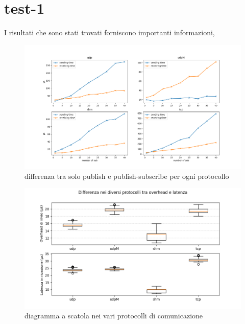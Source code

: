 \section{test-1}
I risultati che sono stati trovati forniscono importanti informazioni, %

\begin{figure}[H]
    \includegraphics[width=\textwidth]{./results/test3_different_protocol_send_receive.png} 
        \caption{differenza tra solo publish e publish-subscribe per ogni protocollo}
        \label{fig:test3_different_protocols}
\end{figure}

\begin{figure}[H]
    \includegraphics[width=\textwidth]{./results/test1_box_sr_1p1s.png} 
        \caption{diagramma a scatola nei vari protocolli di comunicazione}
        \label{fig:test1sdbox}
\end{figure}

